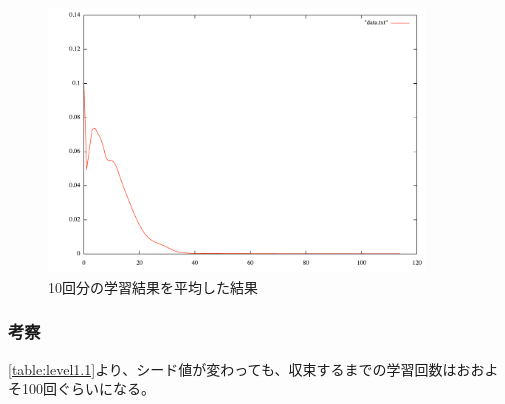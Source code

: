\begin{figure}[h]
 \begin{center}
  \includegraphics[width=10.0cm]{figs/ex_ave.pdf}
  \caption{10回分の学習結果を平均した結果}
  \label{graph:level1.1-2}
 \end{center}
\end{figure}

\subsubsection{考察}
\ref{table:level1.1}より、シード値が変わっても、収束するまでの学習回数はおおよそ100回ぐらいになる。

